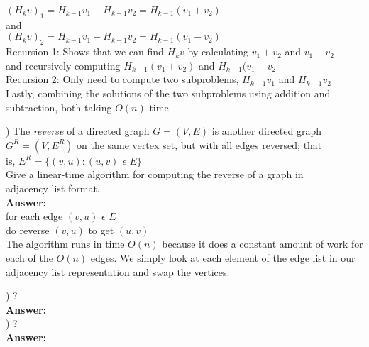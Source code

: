 \documentclass{article}
\begin{document}
\indent \indent \indent $(H_{k}v)_{1} = H_{k - 1}v_{1} + H_{k - 1}v_{2} = H_{k - 1}(v_{1} + v_{2})$ \\
and \\
\indent \indent \indent $(H_{k}v)_{2} = H_{k - 1}v_{1} - H_{k - 1}v_{2} = H_{k - 1}(v_{1} - v_{2})$ \\

Recursion 1: Shows that we can find $H_{k}v$ by calculating $v_{1} + v_{2}$ and $v_{1} - v_{2}$ \\
and recursively computing $H_{k - 1}(v_{1} + v_{2})$ and $H_{k - 1}(v_{1} - v_{2}$ \\

Recursion 2: Only need to compute two subproblems, $H_{k - 1}v_{1}$ and $H_{k - 1}v_{2}$ \\

Lastly, combining the solutions of the two subproblems using addition and subtraction, both taking $O(n)$ time. 


\vspace{.3in}
) The \textit{reverse} of a directed graph $G = (V, E)$ is another directed graph \\
\indent $G^{R} = (V, E^{R})$ on the same vertex set, but with all edges reversed; that \\
\indent is, $E^R =\big\{(v, u) : (u, v)$ $\epsilon$ $E\big\}$ \\

Give a linear-time algorithm for computing the reverse of a graph in \\
adjacency list format. \\
\vspace{.1in}
{\bf Answer:} \\
 for each edge $(v, u)$ $\epsilon$ $E$ \\
 \indent do reverse $(v, u)$ to get $(u, v)$ \\

The algorithm runs in time $O(n)$ because it does a constant amount of work for each of the $O(n)$ edges. We simply look at each element of the edge list in our adjacency list representation and swap the vertices.

\vspace{.3in}
) ?\\
\vspace{.1in}
{\bf Answer:} \\

\vspace{.3in}
) ?\\
\vspace{.1in}
{\bf Answer:} \\
\end{document}
